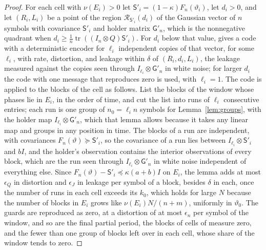 \documentclass[11pt,onecolumn]{IEEEtran}
\newcommand{\tr}{\operatorname{tr}}
\begin{document}
\begin{proof}
For each cell with $\nu(E_i)>0$ let $\mathsf S'_i=(1-\kappa)F_n(\vartheta_i)$,
let $d_i>0$, and let $(R_i,L_i)$ be a point of the region
$\mathcal R_{\mathsf S'_i}(d_i)$ of the Gaussian vector of $n$ symbols with
covariance $\mathsf S'_i$ and holder matrix $\mathsf G'_n$, which is the
nonnegative quadrant when $d_i\ge\tfrac1n\tr((I_n\otimes Q)\mathsf S'_i)$. For
$d_i$ below that value, \cite[Theorem~3]{part1} gives a code with a
deterministic encoder for $\ell_i$ independent copies of that vector, for
some $\ell_i$, with rate, distortion, and leakage within $\delta$ of
$(R_i,d_i,L_i)$, the leakage measured against the copies seen through
$I_{\ell_i}\otimes\mathsf G'_n$ in white noise; for larger $d_i$ the code with
one message that reproduces zero is used, with $\ell_i=1$. The code is
applied to the blocks of the cell as follows. List the blocks of the
window whose phases lie in $E_i$, in the order of time, and cut the list
into runs of $\ell_i$ consecutive entries; each run is one group of
$n_0=\ell_in$ symbols for Lemma~\ref{lem:groups}, with the holder map
$I_{\ell_i}\otimes\mathsf G'_n$, which that lemma allows because it takes any
linear map and groups in any position in time. The blocks of a run are
independent, with covariances $F_n(\vartheta)\succeq\mathsf S'_i$, so the
covariance of a run lies between $I_{\ell_i}\otimes\mathsf S'_i$ and $bI$, and
the holder's observation contains the interior observations of every
block, which are the run seen through $I_{\ell_i}\otimes\mathsf G'_n$ in white
noise independent of everything else. Since
$F_n(\vartheta)-\mathsf S'_i\preceq\kappa(a+b)I$ on $E_i$, the lemma adds at
most $\epsilon_Q$ in distortion and $\epsilon_J$ in leakage per symbol of a
block, besides $\delta$ in each, once the number of runs in each cell
exceeds its $k_0$, which holds for large $N$ because the number of blocks
in $E_i$ grows like $\nu(E_i)N/(n+m)$, uniformly in $\vartheta_0$.
The guards are reproduced as zero, at a distortion of at most
$\epsilon_n$ per symbol of the window, and so are the final partial
period, the blocks of cells of measure zero, and the fewer than one
group of blocks left over in each cell, whose share of the window tends
to zero.


\end{proof}
\end{document}
